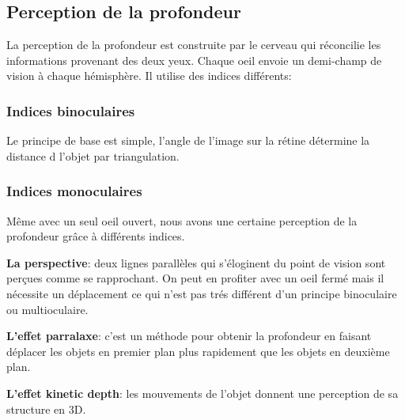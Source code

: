 \subsection{Perception de la profondeur}

La perception de la profondeur est construite par le cerveau qui r\'econcilie les informations provenant des deux yeux. Chaque oeil envoie un demi-champ de vision \`a chaque h\'emisph\`ere. Il utilise des indices diff\'erents:

\subsubsection{Indices binoculaires}

Le principe de base est simple, l'angle de l'image sur la r\'etine d\'etermine la distance d l'objet par triangulation.

\subsubsection{Indices monoculaires}

M\^eme avec un seul oeil ouvert, nous avons une certaine perception de la profondeur gr\^ace \`a diff\'erents indices. 

\textbf{La perspective}: deux lignes parall\`eles qui s'\'eloginent du point de vision sont per\c{c}ues comme se rapprochant. On peut en profiter avec un oeil ferm\'e mais il n\'ecessite un d\'eplacement ce qui n'est pas tr\'es diff\'erent d'un principe binoculaire ou multioculaire.

\textbf{L'effet parralaxe}: c'est un m\'ethode pour obtenir la profondeur en faisant d\'eplacer les objets en premier plan plus rapidement que les objets en deuxi\`eme plan.

\textbf{L'effet kinetic depth}: les mouvements de l'objet donnent une perception de sa structure en 3D.


\begin{figure}[H]
\centering
{}
\end{figure}

